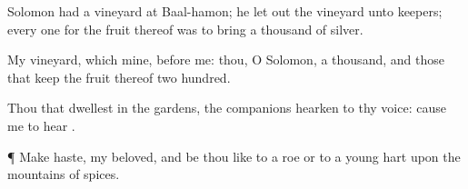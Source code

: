 {Solomon had a
vineyard at
Baal-hamon; he let
out the
vineyard unto
keepers; every
one for the
fruit thereof was to
bring a
thousand
{} of
silver.

My
vineyard, which
{} mine,
{}
before me: thou, O
Solomon,
{} a
thousand, and those that
keep the
fruit thereof two
hundred.


\par }{\PP {}Thou that
dwellest in the
gardens, the
companions
hearken to thy
voice: cause me to
hear
{}.


\par }{\PP {}¶ Make
haste, my
beloved, and be thou
like to a
roe or to a
young
hart upon the
mountains of
spices.


\par }